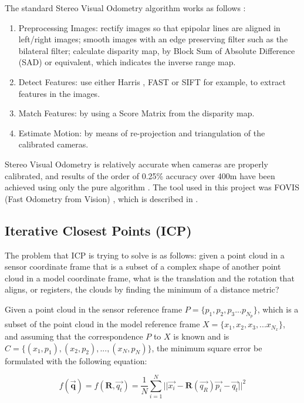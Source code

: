 \documentclass[11pt]{article}
\begin{document}
The standard Stereo Visual Odometry algorithm works as follows \cite{StereoVis1}:

\begin{enumerate}[leftmargin=.8in]
\item Preprocessing Images: rectify images so that epipolar lines are aligned in left/right images; smooth images with an edge preserving filter such as the bilateral filter; calculate disparity map, by Block Sum of Absolute Difference (SAD) or equivalent, which indicates the inverse range map.
\item Detect Features: use either Harris \cite{Harris}, FAST \cite{FAST} or  SIFT \cite{SIFT} for example, to extract features in the images.
\item Match Features: by using a Score Matrix from the disparity map.
\item Estimate Motion: by means of re-projection and triangulation of the calibrated cameras.
\end{enumerate}
	
Stereo Visual Odometry is relatively accurate when cameras are properly calibrated, and results of the order of 0.25\% accuracy over 400m have been achieved using only the pure algorithm \cite{StereoVis1}. The tool used in this project was FOVIS (Fast Odometry from Vision) \cite{fovis}, which is described in \cite{VisualOdometry}.
	
	\subsection{Iterative Closest Points (ICP)}
	\label{subs:ICP}
The problem that ICP is trying to solve is as follows: given a point cloud in a sensor coordinate frame that is a subset of a complex shape of another point cloud in a model coordinate frame, what is the translation and the rotation that aligns, or registers, the clouds by finding the minimum of a distance metric?
	
Given a point cloud in the sensor reference frame $P = \{p_1, p_2, p_3 ... p_{N_p}\}$, which is a subset of the point cloud in the model reference frame $X = \{x_1, x_2, x_3, ... x_{N_x}\}$, and assuming that the correspondence $P$ to $X$ is known and is $C = \{(x_1,p_1), (x_2,p_2), ... , (x_N, p_N)\}$, the minimum square error be formulated with the following equation:
	
\begin{equation}
f(\mathbf{\overrightarrow{q}}) = f(\mathbf{R},\overrightarrow{q_t}) = \frac{1}{N}\sum_{i=1}^{N}{||\overrightarrow{x_i}-\mathbf{R}(\overrightarrow{q_R})\overrightarrow{p_i}-\overrightarrow{q_t}||^{2}} 	
\label{eq:ICPObjective}
\end{equation}		
	
\end{document}
